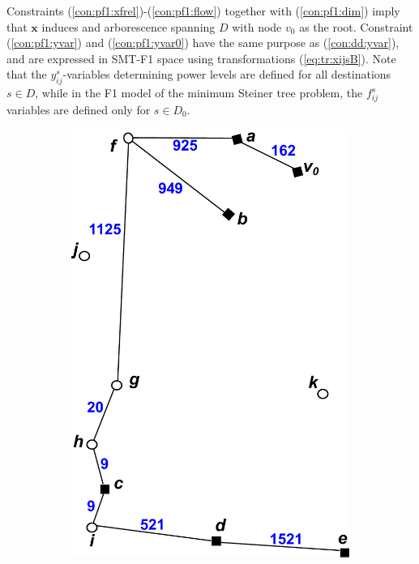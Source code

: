     Constraints (\ref{con:pf1:xfrel})-(\ref{con:pf1:flow}) together with (\ref{con:pf1:dim}) imply that $\mathbf{x}$ induces and arborescence spanning $D$ with node $v_0$ as the root. Constraint (\ref{con:pf1:yvar}) and (\ref{con:pf1:yvar0}) have the same purpose as (\ref{con:dd:yvar}), and are expressed in SMT-F1 space using transformations (\ref{eq:tr:xijsB}). Note that the $y_{ij}^s$-variables determining power levels are defined for all destinations $s\in D$, while in the F1 model of the minimum Steiner tree problem, the $f_{ij}^s$ variables are defined only for $s\in D_0$. 
\begin{figure}[!htb]
    \centering
    \begin{subfigure}[b]{0.4\textwidth}
        \includegraphics[width=\textwidth]{conBNec}

\end{subfigure}
\end{figure}
